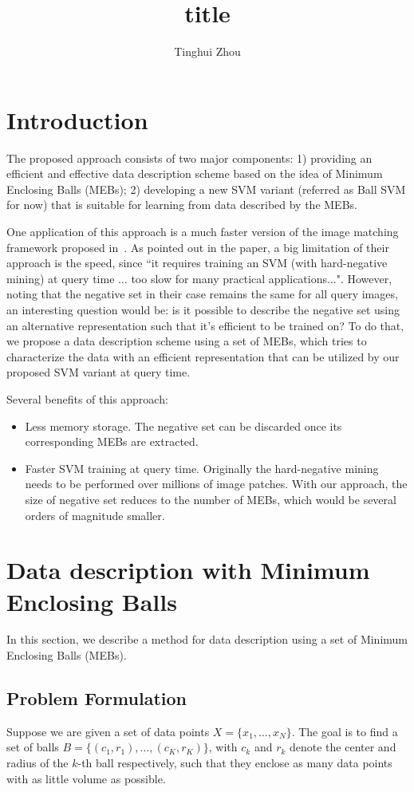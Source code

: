 \documentclass[12pt]{article}
\begin{document}
\title{title}
\author{Tinghui Zhou}
\date{}

\maketitle
\section{Introduction}
The proposed approach consists of two major components: 1) providing an efficient and effective data description scheme based on the idea of Minimum Enclosing Balls (MEBs); 2) developing a new SVM variant (referred as Ball SVM for now) that is suitable for learning from data described by the MEBs. 

One application of this approach is a much faster version of the image matching framework proposed in~\cite{shrivastava11}. As pointed out in the paper, a big limitation of their approach is the speed, since ``it requires training an SVM (with hard-negative mining) at query time ... too slow for many practical applications...". However, noting that the negative set in their case remains the same for all query images, an interesting question would be: is it possible to describe the negative set using an alternative representation such that it's efficient to be trained on? To do that, we propose a data description scheme using a set of MEBs, which tries to characterize the data with an efficient representation that can be utilized by our proposed SVM variant at query time.

Several benefits of this approach:
\begin{itemize}
\item Less memory storage. The negative set can be discarded once its corresponding MEBs are extracted.
\item Faster SVM training at query time. Originally the hard-negative mining needs to be performed over millions of image patches. With our approach, the size of negative set reduces to the number of MEBs, which would be several orders of magnitude smaller.
\end{itemize}

\section{Data description with Minimum Enclosing Balls}
In this section, we describe a method for data description using a set of Minimum Enclosing Balls (MEBs). 

\subsection{Problem Formulation}
Suppose we are given a set of data points $X = \{x_1, \ldots, x_N \}$. The goal is to find a set of balls $B = \{ (c_1, r_1), \ldots, (c_K, r_K) \}$, with $c_k$ and $r_k$ denote the center and radius of the $k$-th ball respectively, such that they enclose as many data points with as little volume as possible. 
\end{document}
